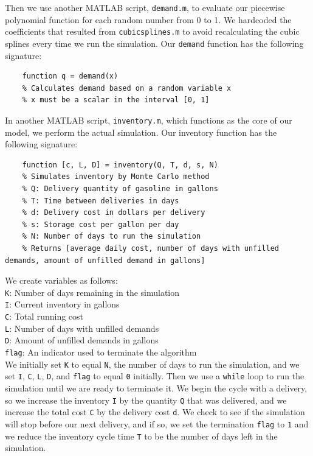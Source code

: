 \documentclass{article}
\begin{document}
    Then we use another MATLAB script, \texttt{demand.m}, to evaluate our piecewise polynomial function for each random number from 0 to 1. We hardcoded the coefficients that resulted from \texttt{cubicsplines.m} to avoid recalculating the cubic splines every time we run the simulation. Our \texttt{demand} function has the following signature:
    \begin{verbatim}
    function q = demand(x)
    % Calculates demand based on a random variable x
    % x must be a scalar in the interval [0, 1]
    \end{verbatim}
    In another MATLAB script, \texttt{inventory.m}, which functions as the core of our model, we perform the actual simulation. Our inventory function has the following signature:
    \begin{verbatim}
    function [c, L, D] = inventory(Q, T, d, s, N)
    % Simulates inventory by Monte Carlo method
    % Q: Delivery quantity of gasoline in gallons
    % T: Time between deliveries in days
    % d: Delivery cost in dollars per delivery
    % s: Storage cost per gallon per day
    % N: Number of days to run the simulation
    % Returns [average daily cost, number of days with unfilled demands, amount of unfilled demand in gallons]
    \end{verbatim}
    We create variables as follows:\\
    \texttt{K}: Number of days remaining in the simulation\\
    \texttt{I}: Current inventory in gallons\\
    \texttt{C}: Total running cost\\
    \texttt{L}: Number of days with unfilled demands\\
    \texttt{D}: Amount of unfilled demands in gallons\\
    \texttt{flag}: An indicator used to terminate the algorithm\\

    \pagebreak
    We initially set \texttt{K} to equal \texttt{N}, the number of days to run the simulation, and we set \texttt{I}, \texttt{C}, \texttt{L}, \texttt{D}, and \texttt{flag} to equal \texttt{0} initially. Then we use a \texttt{while} loop to run the simulation until we are ready to terminate it. We begin the cycle with a delivery, so we increase the inventory \texttt{I} by the quantity \texttt{Q} that was delivered, and we increase the total cost \texttt{C} by the delivery cost \texttt{d}. We check to see if the simulation will stop before our next delivery, and if so, we set the termination \texttt{flag} to \texttt{1} and we reduce the inventory cycle time \texttt{T} to be the number of days left in the simulation.
\end{document}
